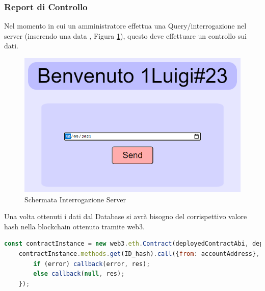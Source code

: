 \documentclass[11pt,a4paper,titlepage]{report}
\begin{document}
\subsubsection{Report di Controllo}
Nel momento in cui un amministratore effettua una Query/interrogazione nel server (inserendo una data , Figura \ref{fig:Query}), questo deve effettuare un controllo sui dati.

\begin{figure}[h]
	\includegraphics[width=\textwidth]{Query}
	\centering
	\caption{Schermata Interrogazione Server}
	\label{fig:Query}
\end{figure}

Una volta ottenuti i dati dal Database si avrà bisogno del corrispettivo valore hash nella blockchain ottenuto tramite web3.
\begin{lstlisting}[language=JavaScript]
  	const contractInstance = new web3.eth.Contract(deployedContractAbi, deployedContractAddress);
 	contractInstance.methods.get(ID_hash).call({from: accountAddress}, (error, res) =>{
 	 	if (error) callback(error, res);
 	 	else callback(null, res);
 	});
\end{lstlisting}
\end{document}
